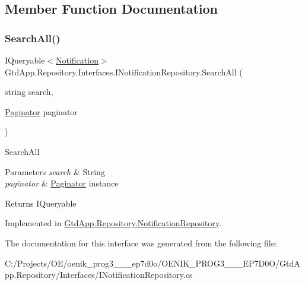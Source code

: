 \subsection{Member Function Documentation}
\mbox{\label{interface_gtd_app_1_1_repository_1_1_interfaces_1_1_i_notification_repository_ace09da4279367d4edb68b6094c13d8e2}} 
\subsubsection{\texorpdfstring{Search\+All()}{SearchAll()}}
{\footnotesize\ttfamily I\+Queryable$<$\mbox{\hyperlink{class_gtd_app_1_1_data_1_1_notification}{Notification}}$>$ Gtd\+App.\+Repository.\+Interfaces.\+I\+Notification\+Repository.\+Search\+All (\begin{DoxyParamCaption}\item[{string}]{search,  }\item[{\mbox{\hyperlink{class_gtd_app_1_1_repository_1_1_paginator}{Paginator}}}]{paginator }\end{DoxyParamCaption})}



Search\+All 


\begin{DoxyParams}{Parameters}
{\em search} & String\\
\hline
{\em paginator} & \mbox{\hyperlink{class_gtd_app_1_1_repository_1_1_paginator}{Paginator}} instance\\
\hline
\end{DoxyParams}
\begin{DoxyReturn}{Returns}
I\+Queryable
\end{DoxyReturn}


Implemented in \mbox{\hyperlink{class_gtd_app_1_1_repository_1_1_notification_repository_ae7d00a78be601d51ade9419123960ec7}{Gtd\+App.\+Repository.\+Notification\+Repository}}.



The documentation for this interface was generated from the following file\+:\begin{DoxyCompactItemize}
\item 
C\+:/\+Projects/\+O\+E/oenik\+\_\+prog3\+\_\+\_\+\_\+ep7d0o/\+O\+E\+N\+I\+K\+\_\+\+P\+R\+O\+G3\+\_\+\_\+\_\+\+E\+P7\+D0\+O/\+Gtd\+App.\+Repository/\+Interfaces/I\+Notification\+Repository.\+cs\end{DoxyCompactItemize}
